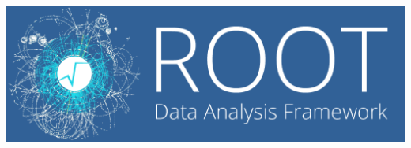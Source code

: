 \begin{titlepage}
\begingroup
    \fontsize{14pt}{12pt}\selectfont
    

\vspace*{-1.5cm}






\vspace*{1cm}



\begin{center}
\includegraphics[width=.5\textwidth]{figs/root_logo.png}
\end{center}


\end{titlepage}
